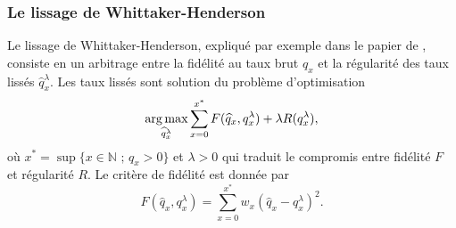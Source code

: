 \subsubsection{Le lissage de Whittaker-Henderson}
Le lissage de Whittaker-Henderson, expliqué par exemple dans le papier de \citet{Weinert2007}, consiste en un arbitrage entre la fidélité au taux brut $\widehat{q}_x$ et la régularité des taux lissés $\widehat{q}^\lambda_x$. Les taux lissés sont solution du problème d'optimisation 
$$
\operatorname*{arg\,max}_{\widehat{q}^\lambda_x} \sum_{x=0}^{x^\ast}  F(\widehat{q}_x, q_x^\lambda) + \lambda R(q_x^\lambda),
$$
où $x^{\ast} = \sup \{x\in\mathbb{N}\text{ ; }q_x>0\}$ et $\lambda >0$ qui traduit le compromis entre fidélité $F$ et régularité $R$. Le critère de fidélité est donnée par 
$$
F(\widehat{q}_x, q_x^\lambda) = \sum_{x=0}^{x^\ast} w_x(\widehat{q}_x - q^{\lambda}_x)^2.
$$


